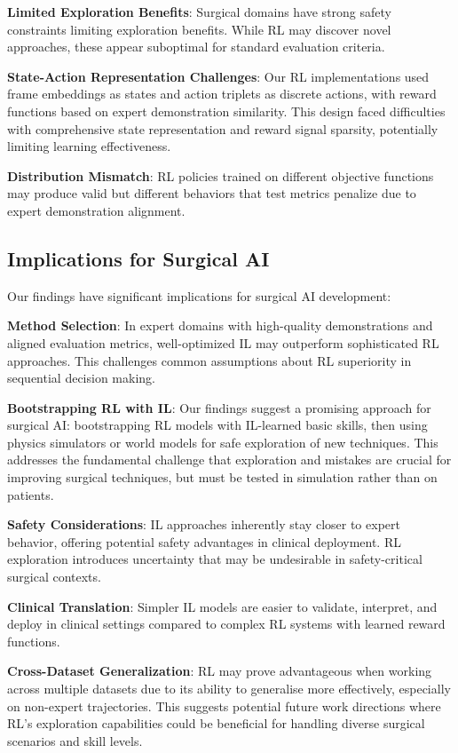 \documentclass[runningheads]{llncs}
\begin{document}
\textbf{Limited Exploration Benefits}: Surgical domains have strong safety constraints limiting exploration benefits. While RL may discover novel approaches, these appear suboptimal for standard evaluation criteria.

\textbf{State-Action Representation Challenges}: Our RL implementations used frame embeddings as states and action triplets as discrete actions, with reward functions based on expert demonstration similarity. This design faced difficulties with comprehensive state representation and reward signal sparsity, potentially limiting learning effectiveness.

\textbf{Distribution Mismatch}: RL policies trained on different objective functions may produce valid but different behaviors that test metrics penalize due to expert demonstration alignment.

\subsection{Implications for Surgical AI}

Our findings have significant implications for surgical AI development:

\textbf{Method Selection}: In expert domains with high-quality demonstrations and aligned evaluation metrics, well-optimized IL may outperform sophisticated RL approaches. This challenges common assumptions about RL superiority in sequential decision making.

\textbf{Bootstrapping RL with IL}: Our findings suggest a promising approach for surgical AI: bootstrapping RL models with IL-learned basic skills, then using physics simulators or world models for safe exploration of new techniques. This addresses the fundamental challenge that exploration and mistakes are crucial for improving surgical techniques, but must be tested in simulation rather than on patients.

\textbf{Safety Considerations}: IL approaches inherently stay closer to expert behavior, offering potential safety advantages in clinical deployment. RL exploration introduces uncertainty that may be undesirable in safety-critical surgical contexts.

\textbf{Clinical Translation}: Simpler IL models are easier to validate, interpret, and deploy in clinical settings compared to complex RL systems with learned reward functions.

\textbf{Cross-Dataset Generalization}: RL may prove advantageous when working across multiple datasets due to its ability to generalise more effectively, especially on non-expert trajectories. This suggests potential future work directions where RL's exploration capabilities could be beneficial for handling diverse surgical scenarios and skill levels.
\end{document}
